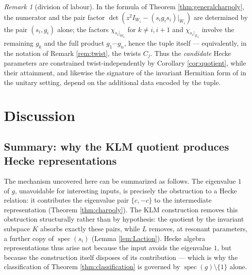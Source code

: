 \documentclass[11pt]{article}
\theoremstyle{definition}
\theoremstyle{remark}
\newtheorem{remark}[theorem]{Remark}
\newcommand{\spec}{\operatorname{spec}}
\begin{document}
\begin{remark}[division of labour]\label{rem:division}
In the formula of Theorem \ref{thm:generalcharpoly}, the numerator and
the pair factor $\det(z^2 I_{W_i} - (s_ig_is_i)|_{W_i})$ are determined
by the pair $(s_i, g_i)$ alone; the factors
$\chi_{s_i|_{W_k}}$ for $k \neq i, i+1$ and
$\chi_{s_i|_{E_{\lambda}}}$ involve the remaining $g_k$ and the full
product $g_1 \cdots g_n$, hence the tuple itself --- equivalently, in
the notation of Remark \ref{rem:twist}, the twists $C_j$. Thus the
\emph{candidate} Hecke parameters are constrained twist-independently
by Corollary \ref{cor:quotient}, while their attainment, and likewise
the signature of the invariant Hermitian form of \cite{Negami25} in the
unitary setting, depend on the additional data encoded by the tuple.
\end{remark}

\section{Discussion}\label{sec:discussion}

\subsection*{Summary: why the KLM quotient produces Hecke
representations}
The mechanism uncovered here can be summarized as follows. The
eigenvalue $1$ of $g$, unavoidable for interesting inputs, is precisely
the obstruction to a Hecke relation: it contributes the eigenvalue pair
$\{c, -c\}$ to the intermediate representation (Theorem
\ref{thm:charpoly}). The KLM construction removes this obstruction
structurally rather than by hypothesis: the quotient by the invariant
subspace $K$ absorbs exactly these pairs, while $L$ removes, at
resonant parameters, a further copy of $\spec(s_i)$ (Lemma
\ref{lem:Laction}). Hecke algebra representations thus arise not
because the input avoids the eigenvalue $1$, but because the
construction itself disposes of its contribution --- which is why the
classification of Theorem \ref{thm:classification} is governed by
$\spec(g) \setminus \{1\}$ alone.
\end{document}
